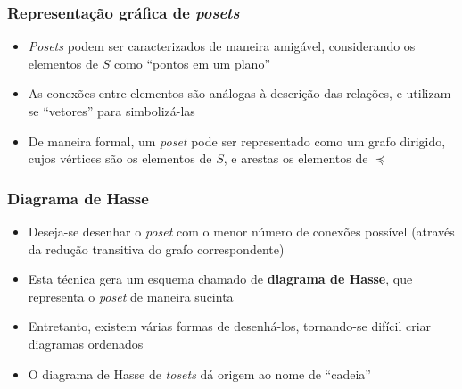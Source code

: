 \documentclass[12pt]{beamer}
\begin{document}
\begin{frame}
  \frametitle{Representação gráfica de \emph{posets}}
  \begin{itemize}
    \item \emph{Posets} podem ser caracterizados de maneira amigável,
        considerando os elementos de $S$ como ``pontos em um plano''
    \item As conexões entre elementos são análogas à descrição das relações, e
        utilizam-se ``vetores'' para simbolizá-las
    \item De maneira formal, um \emph{poset} pode ser representado como um
        grafo dirigido, cujos vértices são os elementos de $S$, e arestas os
          elementos de $\preccurlyeq$
  \end{itemize}
\end{frame}

\begin{frame}
  \frametitle{Diagrama de Hasse}
  \begin{itemize}
    \item Deseja-se desenhar o \emph{poset} com o menor número de conexões
        possível (através da redução transitiva do grafo correspondente)
    \item Esta técnica gera um esquema chamado de \textbf{diagrama de Hasse},
        que representa o \emph{poset} de maneira sucinta
    \item Entretanto, existem várias formas de desenhá-los, tornando-se difícil
        criar diagramas ordenados
    \item O diagrama de Hasse de \emph{tosets} dá origem ao nome de ``cadeia''
  \end{itemize}
\end{frame}
\end{document}
